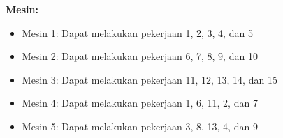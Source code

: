 %
%
%
%
%

\textbf{Mesin:}
\begin{itemize}
    \item Mesin 1: Dapat melakukan pekerjaan 1, 2, 3, 4, dan 5
    \item Mesin 2: Dapat melakukan pekerjaan 6, 7, 8, 9, dan 10
    \item Mesin 3: Dapat melakukan pekerjaan 11, 12, 13, 14, dan 15
    \item Mesin 4: Dapat melakukan pekerjaan 1, 6, 11, 2, dan 7
    \item Mesin 5: Dapat melakukan pekerjaan 3, 8, 13, 4, dan 9
\end{itemize}

